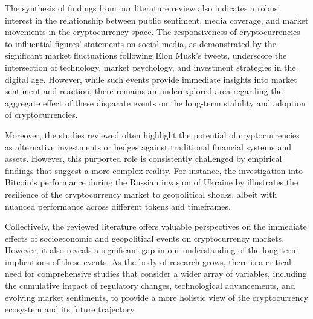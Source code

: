 \documentclass{article}
\begin{document}
The synthesis of findings from our literature review also indicates a robust interest in the relationship between public sentiment, media coverage, and market movements in the cryptocurrency space. The responsiveness of cryptocurrencies to influential figures' statements on social media, as demonstrated by the significant market fluctuations following Elon Musk's tweets, underscore the intersection of technology, market psychology, and investment strategies in the digital age. However, while such events provide immediate insights into market sentiment and reaction, there remains an underexplored area regarding the aggregate effect of these disparate events on the long-term stability and adoption of cryptocurrencies.

Moreover, the studies reviewed often highlight the potential of cryptocurrencies as alternative investments or hedges against traditional financial systems and assets. However, this purported role is consistently challenged by empirical findings that suggest a more complex reality. For instance, the investigation into Bitcoin's performance during the Russian invasion of Ukraine by \cite{gnazzo2022} illustrates the resilience of the cryptocurrency market to geopolitical shocks, albeit with nuanced performance across different tokens and timeframes.

Collectively, the reviewed literature offers valuable perspectives on the immediate effects of socioeconomic and geopolitical events on cryptocurrency markets. However, it also reveals a significant gap in our understanding of the long-term implications of these events. As the body of research grows, there is a critical need for comprehensive studies that consider a wider array of variables, including the cumulative impact of regulatory changes, technological advancements, and evolving market sentiments, to provide a more holistic view of the cryptocurrency ecosystem and its future trajectory.




\end{document}
